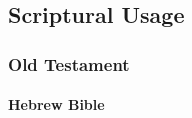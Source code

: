 
\subsection{Scriptural Usage} %
	\label{FACE-SCRIPTURES}
	

	\subsubsection{Old Testament} %
		\label{FACE-OT}
	
	
			
			
		\paragraph{Hebrew Bible}
			\label{FACE-HEBREW}
		
			\subparagraph{\texorpdfstring{}{}} %
				\label{PANEH} %
			
